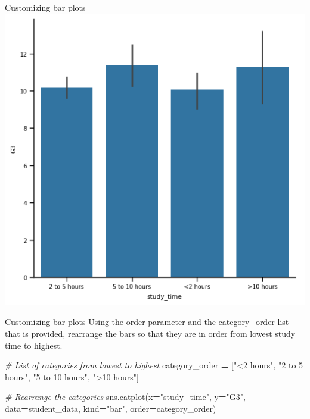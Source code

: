 \documentclass[
  ignorenonframetext,
]{beamer}
\newenvironment{Shaded}{\begin{snugshade}}{\end{snugshade}}
\newcommand{\CommentTok}[1]{\textcolor[rgb]{0.56,0.35,0.01}{\textit{#1}}}
\newcommand{\NormalTok}[1]{#1}
\newcommand{\OperatorTok}[1]{\textcolor[rgb]{0.81,0.36,0.00}{\textbf{#1}}}
\newcommand{\StringTok}[1]{\textcolor[rgb]{0.31,0.60,0.02}{#1}}
\begin{document}
\begin{frame}{Customizing bar plots}
\label{customizing-bar-plots-4}
\includegraphics{../images/im283.png}
\end{frame}

\begin{frame}[fragile]{Customizing bar plots}
\label{customizing-bar-plots-5}
Using the order parameter and the category\_order list that is provided,
rearrange the bars so that they are in order from lowest study time to
highest.


\begin{Shaded}
\begin{Highlighting}[]
\CommentTok{\# List of categories from lowest to highest}
\NormalTok{category\_order }\OperatorTok{=}\NormalTok{ [}\StringTok{"\textless{}2 hours"}\NormalTok{, }
                  \StringTok{"2 to 5 hours"}\NormalTok{, }
                  \StringTok{"5 to 10 hours"}\NormalTok{, }
                  \StringTok{"\textgreater{}10 hours"}\NormalTok{]}

\CommentTok{\# Rearrange the categories}
\NormalTok{sns.catplot(x}\OperatorTok{=}\StringTok{"study\_time"}\NormalTok{, y}\OperatorTok{=}\StringTok{"G3"}\NormalTok{,}
\NormalTok{            data}\OperatorTok{=}\NormalTok{student\_data,}
\NormalTok{            kind}\OperatorTok{=}\StringTok{"bar"}\NormalTok{,}
\NormalTok{            order}\OperatorTok{=}\NormalTok{category\_order)}
\end{Highlighting}
\end{Shaded}
\end{frame}
\end{document}
